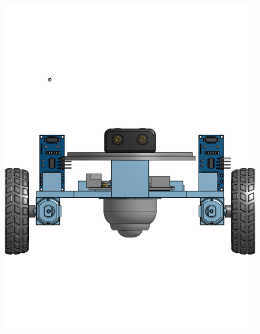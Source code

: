 \documentclass[a4paper,12pt]{article}
\begin{document}
\begin{center}\begin{figure}[H]\centering\includegraphics[height=0.45\textheight]{./model_images/a6.png}\end{figure}\FloatBarrier\end{center}
\end{document}
